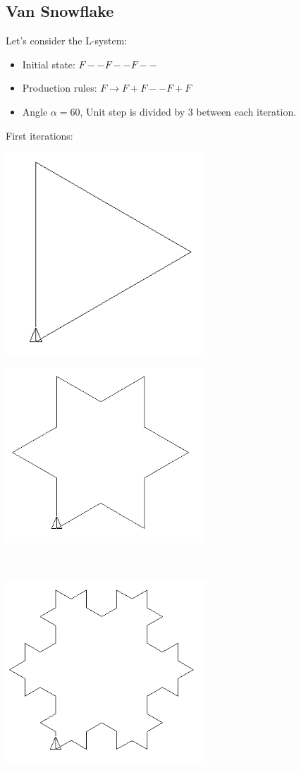 \subsection{Van Snowflake}
Let's consider the L-system:
\begin{itemize}
 \item [\textbullet] Initial state: $F--F--F--$
 \item [\textbullet] Production rules: $F \rightarrow F+F--F+F$
 \item [\textbullet] Angle $\alpha=60$\degre, Unit step is divided by 3 between each iteration.
\end{itemize}
First iterations:
\begin{center}
\begin{minipage}{7.5cm}
 \includegraphics[width=7.5cm]{pics/linden-flocon1.png}
\end{minipage}
\begin{minipage}{7.5cm}
 \includegraphics[width=7.5cm]{pics/linden-flocon2.png}
\end{minipage}\\
\begin{minipage}{7.5cm}
 \includegraphics[width=7.5cm]{pics/linden-flocon3.png}

\end{minipage}
\end{center}
